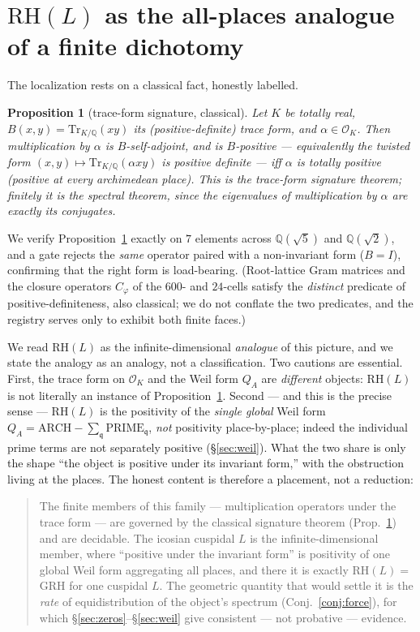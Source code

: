 \documentclass[11pt]{article}
\newtheorem{proposition}[theorem]{Proposition}
\theoremstyle{remark}
\newcommand{\OO}{\mathcal{O}}
\newcommand{\KK}{K}
\newcommand{\RH}{\mathrm{RH}}
\newcommand{\Tr}{\mathrm{Tr}}
\newcommand{\fq}{\mathfrak{q}}
\begin{document}
\section{$\RH(L)$ as the all-places analogue of a finite dichotomy}\label{sec:local}

The localization rests on a classical fact, honestly labelled.

\begin{proposition}[trace-form signature, classical]\label{prop:sig}
Let $\KK$ be totally real, $B(x,y)=\Tr_{\KK/\mathbb{Q}}(xy)$ its (positive-definite) trace
form, and $\alpha\in\OO_\KK$. Then multiplication by $\alpha$ is $B$-self-adjoint, and is
$B$-positive --- equivalently the twisted form $(x,y)\mapsto\Tr_{\KK/\mathbb{Q}}(\alpha xy)$
is positive definite --- \emph{iff} $\alpha$ is totally positive (positive at every
archimedean place). This is the trace-form signature theorem; finitely it is the spectral
theorem, since the eigenvalues of multiplication by $\alpha$ are exactly its conjugates.
\end{proposition}

We verify Proposition~\ref{prop:sig} exactly on $7$ elements across $\mathbb{Q}(\sqrt5)$ and
$\mathbb{Q}(\sqrt2)$, and a gate rejects the \emph{same} operator paired with a
non-invariant form ($B=I$), confirming that the right form is load-bearing. (Root-lattice
Gram matrices and the closure operators $C_\varphi$ of the $600$- and $24$-cells satisfy the
\emph{distinct} predicate of positive-definiteness, also classical; we do not conflate the
two predicates, and the registry serves only to exhibit both finite faces.)

We read $\RH(L)$ as the infinite-dimensional \emph{analogue} of this picture, and we state
the analogy as an analogy, not a classification. Two cautions are essential. First, the
trace form on $\OO_\KK$ and the Weil form $Q_A$ are \emph{different} objects: $\RH(L)$ is not
literally an instance of Proposition~\ref{prop:sig}. Second --- and this is the precise
sense --- $\RH(L)$ is the positivity of the \emph{single global} Weil form
$Q_A=\mathrm{ARCH}-\sum_\fq\mathrm{PRIME}_\fq$, \emph{not} positivity place-by-place; indeed
the individual prime terms are not separately positive (\S\ref{sec:weil}). What the two
share is only the shape ``the object is positive under its invariant form,'' with the
obstruction living at the places. The honest content is therefore a placement, not a
reduction:

\begin{quote}
The finite members of this family --- multiplication operators under the trace form --- are
governed by the classical signature theorem (Prop.~\ref{prop:sig}) and are decidable. The
icosian cuspidal $L$ is the infinite-dimensional member, where ``positive under the
invariant form'' is positivity of one global Weil form aggregating all places, and there it
is exactly $\RH(L)=$ GRH for one cuspidal $L$. The geometric quantity that would settle it
is the \emph{rate} of equidistribution of the object's spectrum (Conj.~\ref{conj:force}),
for which \S\ref{sec:zeros}--\S\ref{sec:weil} give consistent --- not probative --- evidence.
\end{quote}
\end{document}
